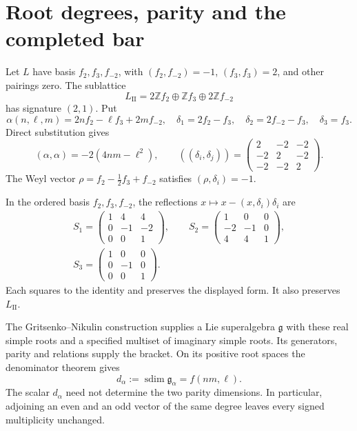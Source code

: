 \section{Root degrees, parity and the completed bar}

Let \(L\) have basis \(f_2,f_3,f_{-2}\), with
\((f_2,f_{-2})=-1\), \((f_3,f_3)=2\), and other pairings zero.
The sublattice
\[
 L_{\mathrm{II}}=2\mathbb Z f_2\oplus\mathbb Z f_3
                  \oplus2\mathbb Z f_{-2}
\]
has signature \((2,1)\). Put
\[
 \alpha(n,\ell,m)=2nf_2-\ell f_3+2mf_{-2},\quad
 \delta_1=2f_2-f_3,\quad
 \delta_2=2f_{-2}-f_3,\quad
 \delta_3=f_3.
\]
Direct substitution gives
\[
 (\alpha,\alpha)=-2(4nm-\ell^2),\qquad
 ((\delta_i,\delta_j))=
 \begin{pmatrix}2&-2&-2\\-2&2&-2\\-2&-2&2\end{pmatrix}.
\]
The Weyl vector \(\rho=f_2-\tfrac12f_3+f_{-2}\) satisfies
\((\rho,\delta_i)=-1\).

In the ordered basis \(f_2,f_3,f_{-2}\), the reflections
\(x\mapsto x-(x,\delta_i)\delta_i\) are
\[
 \begin{gathered}
 S_1=\begin{pmatrix}1&4&4\\0&-1&-2\\0&0&1\end{pmatrix},
 \qquad
 S_2=\begin{pmatrix}1&0&0\\-2&-1&0\\4&4&1\end{pmatrix},\\
 S_3=\begin{pmatrix}1&0&0\\0&-1&0\\0&0&1\end{pmatrix}.
 \end{gathered}
\]
Each squares to the identity and preserves the displayed form.
It also preserves \(L_{\mathrm{II}}\).

The Gritsenko--Nikulin construction supplies a Lie superalgebra
\(\mathfrak g\) with these real simple roots and a specified
multiset of imaginary simple roots.
Its generators, parity and relations supply the bracket.
On its positive root spaces the denominator theorem gives
\[
 d_\alpha:=\operatorname{sdim}\mathfrak g_\alpha=f(nm,\ell).
\]
The scalar \(d_\alpha\) need not determine the two parity dimensions.
In particular, adjoining an even and an odd vector of the same
degree leaves every signed multiplicity unchanged.

